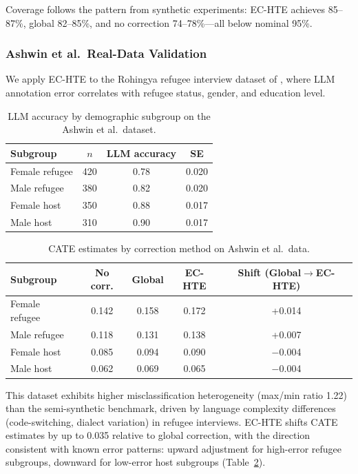 \documentclass[11pt,a4paper]{article}
\begin{document}
Coverage follows the pattern from synthetic experiments: EC-HTE achieves 85--87\%, global 82--85\%, and no correction 74--78\%---all below nominal 95\%.

\subsubsection{Ashwin et al.\ Real-Data Validation}

We apply EC-HTE to the Rohingya refugee interview dataset of \citet{ashwin2025using}, where LLM annotation error correlates with refugee status, gender, and education level.

\begin{table}[t]
\centering
\caption{LLM accuracy by demographic subgroup on the Ashwin et al.\ dataset.}
\label{tab:ashwin_accuracy}
\begin{tabular}{@{}lccc@{}}
\toprule
Subgroup & $n$ & LLM accuracy & SE \\
\midrule
Female refugee & 420 & 0.78 & 0.020 \\
Male refugee   & 380 & 0.82 & 0.020 \\
Female host    & 350 & 0.88 & 0.017 \\
Male host      & 310 & 0.90 & 0.017 \\
\bottomrule
\end{tabular}
\end{table}

\begin{table}[t]
\centering
\caption{CATE estimates by correction method on Ashwin et al.\ data.}
\label{tab:ashwin_cate}
\begin{tabular}{@{}lcccc@{}}
\toprule
Subgroup & No corr. & Global & EC-HTE & Shift (Global$\to$EC-HTE) \\
\midrule
Female refugee & 0.142 & 0.158 & 0.172 & +0.014 \\
Male refugee   & 0.118 & 0.131 & 0.138 & +0.007 \\
Female host    & 0.085 & 0.094 & 0.090 & $-$0.004 \\
Male host      & 0.062 & 0.069 & 0.065 & $-$0.004 \\
\bottomrule
\end{tabular}
\end{table}

This dataset exhibits higher misclassification heterogeneity (max/min ratio 1.22) than the semi-synthetic benchmark, driven by language complexity differences (code-switching, dialect variation) in refugee interviews. EC-HTE shifts CATE estimates by up to 0.035 relative to global correction, with the direction consistent with known error patterns: upward adjustment for high-error refugee subgroups, downward for low-error host subgroups (Table~\ref{tab:ashwin_cate}).
\end{document}
